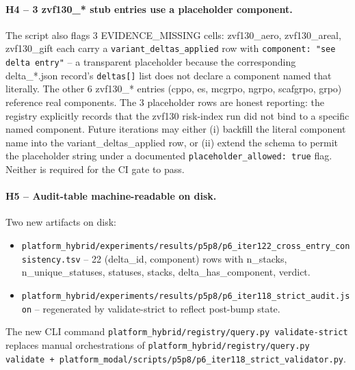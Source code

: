 \documentclass{article}
\begin{document}
\paragraph{H4 -- 3 zvf130\_* stub entries use a placeholder component.}
The script also flags 3 EVIDENCE\_MISSING cells: zvf130\_aero,
zvf130\_areal, zvf130\_gift each carry a \texttt{variant\_deltas\_applied}
row with \texttt{component: "see delta entry"} -- a transparent
placeholder because the corresponding delta\_*.json record's
\texttt{deltas[]} list does not declare a component named that
literally. The other 6 zvf130\_* entries
(cppo, es, mcgrpo, ngrpo, scafgrpo, grpo) reference real components.
The 3 placeholder rows are honest reporting: the registry explicitly
records that the zvf130 risk-index run did not bind to a specific named
component. Future iterations may either (i) backfill the literal
component name into the variant\_deltas\_applied row, or (ii) extend
the schema to permit the placeholder string under a documented
\texttt{placeholder\_allowed: true} flag. Neither is required for the
CI gate to pass.

\paragraph{H5 -- Audit-table machine-readable on disk.}
Two new artifacts on disk:
\begin{itemize}
\item \texttt{platform_hybrid/experiments/results/p5p8/p6\_iter122\_cross\_entry\_consistency.tsv}
      -- 22 (delta\_id, component) rows with n\_stacks, n\_unique\_statuses,
      statuses, stacks, delta\_has\_component, verdict.
\item \texttt{platform_hybrid/experiments/results/p5p8/p6\_iter118\_strict\_audit.json}
      -- regenerated by validate-strict to reflect post-bump state.
\end{itemize}
The new CLI command \texttt{platform_hybrid/registry/query.py validate-strict} replaces
manual orchestrations of \texttt{platform_hybrid/registry/query.py validate +
platform_modal/scripts/p5p8/p6\_iter118\_strict\_validator.py}.
\end{document}
